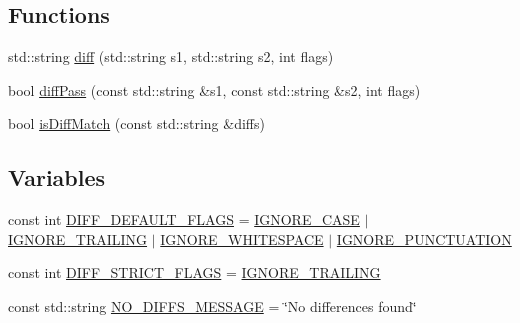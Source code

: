 \subsection*{Functions}
\begin{DoxyCompactItemize}
\item 
std\+::string \mbox{\hyperlink{namespacesgl_1_1priv_1_1diff_a37f80e92da40347774327a755bdf4c93}{diff}} (std\+::string s1, std\+::string s2, int flags)
\item 
bool \mbox{\hyperlink{namespacesgl_1_1priv_1_1diff_a68a39e10b40db02df1d941fe83cc9828}{diff\+Pass}} (const std\+::string \&s1, const std\+::string \&s2, int flags)
\item 
bool \mbox{\hyperlink{namespacesgl_1_1priv_1_1diff_a02aeebb7bbdd2871ba3d5470721004e5}{is\+Diff\+Match}} (const std\+::string \&diffs)
\end{DoxyCompactItemize}
\subsection*{Variables}
\begin{DoxyCompactItemize}
\item 
const int \mbox{\hyperlink{namespacesgl_1_1priv_1_1diff_a5044abd56bc89e814e2d953b8e8c0a65}{D\+I\+F\+F\+\_\+\+D\+E\+F\+A\+U\+L\+T\+\_\+\+F\+L\+A\+GS}} = \mbox{\hyperlink{namespacesgl_1_1priv_1_1diff_ab3b1c38517a62ce7edefba7b93b406dda743829c4dd20c98f1a4db5f83106d839}{I\+G\+N\+O\+R\+E\+\_\+\+C\+A\+SE}} $\vert$ \mbox{\hyperlink{namespacesgl_1_1priv_1_1diff_ab3b1c38517a62ce7edefba7b93b406dda4cf05931c8f25fb17d9f490c6bd67d70}{I\+G\+N\+O\+R\+E\+\_\+\+T\+R\+A\+I\+L\+I\+NG}} $\vert$ \mbox{\hyperlink{namespacesgl_1_1priv_1_1diff_ab3b1c38517a62ce7edefba7b93b406ddab94634739aa9d0705e2eb7976a969a20}{I\+G\+N\+O\+R\+E\+\_\+\+W\+H\+I\+T\+E\+S\+P\+A\+CE}} $\vert$ \mbox{\hyperlink{namespacesgl_1_1priv_1_1diff_ab3b1c38517a62ce7edefba7b93b406dda84e6a2f9f288157ed7a207dc744e1d46}{I\+G\+N\+O\+R\+E\+\_\+\+P\+U\+N\+C\+T\+U\+A\+T\+I\+ON}}
\item 
const int \mbox{\hyperlink{namespacesgl_1_1priv_1_1diff_aada938db21bf68a19d23eca0fddc551b}{D\+I\+F\+F\+\_\+\+S\+T\+R\+I\+C\+T\+\_\+\+F\+L\+A\+GS}} = \mbox{\hyperlink{namespacesgl_1_1priv_1_1diff_ab3b1c38517a62ce7edefba7b93b406dda4cf05931c8f25fb17d9f490c6bd67d70}{I\+G\+N\+O\+R\+E\+\_\+\+T\+R\+A\+I\+L\+I\+NG}}
\item 
const std\+::string \mbox{\hyperlink{namespacesgl_1_1priv_1_1diff_a4f8bdb0eae6c54a481aba9358db1e9ab}{N\+O\+\_\+\+D\+I\+F\+F\+S\+\_\+\+M\+E\+S\+S\+A\+GE}} = \char`\"{}No differences found\char`\"{}
\end{DoxyCompactItemize}


